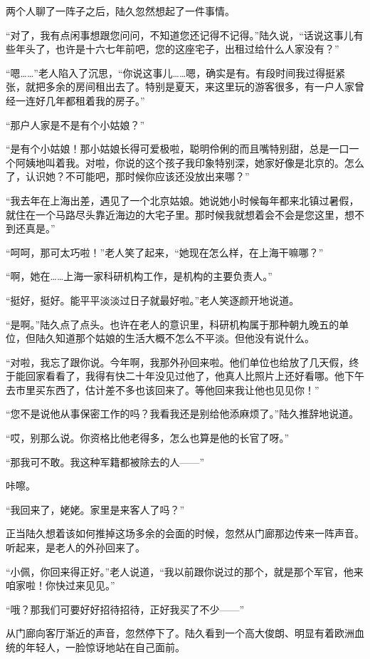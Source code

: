 两个人聊了一阵子之后，陆久忽然想起了一件事情。

“对了，我有点闲事想跟您问问，不知道您还记得不记得。”陆久说，“话说这事儿有些年头了，也许是十六七年前吧，您的这座宅子，出租过给什么人家没有？”

“嗯……”老人陷入了沉思，“你说这事儿……嗯，确实是有。有段时间我过得挺紧张，就把多余的房间租出去了。特别是夏天，来这里玩的游客很多，有一户人家曾经一连好几年都租着我的房子。”

“那户人家是不是有个小姑娘？”

“是有个小姑娘！那小姑娘长得可爱极啦，聪明伶俐的而且嘴特别甜，总是一口一个阿姨地叫着我。对啦，你说的这个孩子我印象特别深，她家好像是北京的。怎么了，认识她？不可能吧，那时候你应该还没放出来哪？”

“我去年在上海出差，遇见了一个北京姑娘。她说她小时候每年都来北镇过暑假，就住在一个马路尽头靠近海边的大宅子里。那时候我就想着会不会是您这里，想不到还真是。”

“呵呵，那可太巧啦！”老人笑了起来，“她现在怎么样，在上海干嘛哪？”

“啊，她在……上海一家科研机构工作，是机构的主要负责人。”

“挺好，挺好。能平平淡淡过日子就最好啦。”老人笑逐颜开地说道。

“是啊。”陆久点了点头。也许在老人的意识里，科研机构属于那种朝九晚五的单位，但陆久知道那个姑娘的生活大概不怎么不平淡。但他没有说什么。

“对啦，我忘了跟你说。今年啊，我那外孙回来啦。他们单位也给放了几天假，终于能回家看看了，我得有快二十年没见过他了，他真人比照片上还好看哪。他下午去市里买东西了，估计差不多也该回来了。等他回来我让他也见见你！”

“您不是说他从事保密工作的吗？我看我还是别给他添麻烦了。”陆久推辞地说道。

“哎，别那么说。你资格比他老得多，怎么也算是他的长官了呀。”

“那我可不敢。我这种军籍都被除去的人——”

咔嚓。

“我回来了，姥姥。家里是来客人了吗？”

正当陆久想着该如何推掉这场多余的会面的时候，忽然从门廊那边传来一阵声音。听起来，是老人的外孙回来了。

“小佩，你回来得正好。”老人说道，“我以前跟你说过的那个，就是那个军官，他来咱家啦！你快过来见见。”

“哦？那我们可要好好招待招待，正好我买了不少——”

从门廊向客厅渐近的声音，忽然停下了。陆久看到一个高大俊朗、明显有着欧洲血统的年轻人，一脸惊讶地站在自己面前。

